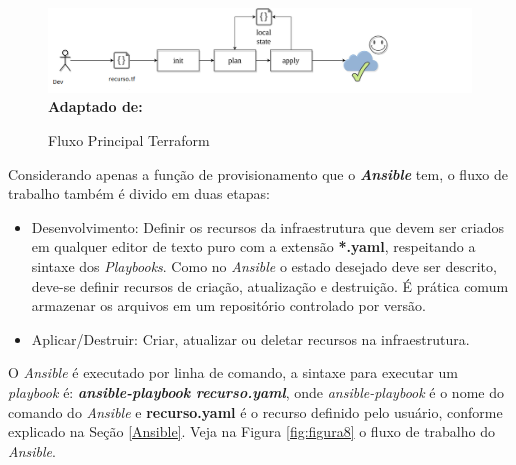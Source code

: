 \begin{figure}[H]
	\centering	
	\caption[\hspace{0.1cm}Fluxo Principal Terraform]{Fluxo Principal Terraform}
	\vspace{-0.4cm}
	\includegraphics[width=1.2\textwidth]{artigo/figuras/terraform_single_workflow.png}
	 \vspace{-0.2cm}
	\\\textbf{\footnotesize Adaptado de: \cite{Turbinskii}}
	\label{fig:figura7}
\end{figure}
\vspace{-0.5cm}

\hfill

Considerando apenas a função de provisionamento que o \textbf{\textit{Ansible}} tem, o fluxo de trabalho também é divido em duas etapas:

\begin{itemize}
  \item Desenvolvimento: Definir os recursos da infraestrutura que devem ser criados em qualquer editor de texto puro com a extensão \textbf{*.yaml}, respeitando a sintaxe dos \textit{Playbooks}. Como no \textit{Ansible} o estado desejado deve ser descrito, deve-se definir recursos de criação, atualização e destruição.  É prática comum armazenar os arquivos em um repositório controlado por versão. 
  \item Aplicar/Destruir: Criar, atualizar ou deletar recursos na infraestrutura. 
\end{itemize}

O \textit{Ansible} é executado por linha de comando, a sintaxe para executar um \textit{playbook} é: \textbf{\textit{ansible-playbook recurso.yaml}}, onde \textit{ansible-playbook} é o nome do comando do \textit{Ansible} e \textbf{recurso.yaml} é o recurso definido pelo usuário, conforme explicado na Seção \ref{Ansible}. Veja na Figura \ref{fig:figura8} o fluxo de trabalho do \textit{Ansible}.   


